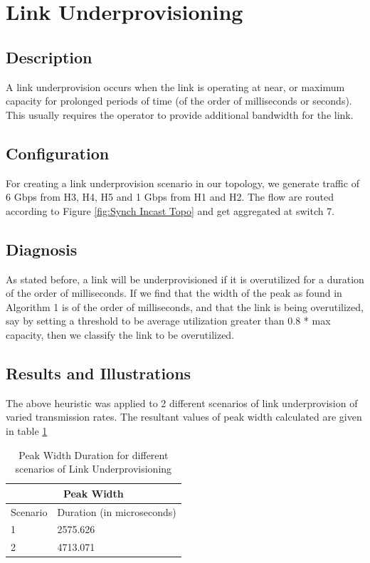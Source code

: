 \section{Link Underprovisioning}
\subsection{Description}
A link underprovision occurs when the link is operating at near, or maximum capacity for prolonged periods of time (of the order of milliseconds or seconds).
This usually requires the operator to provide additional bandwidth for the link.
\subsection{Configuration}
For creating a link underprovision scenario in our topology, we generate traffic of 6 Gbps from H3, H4, H5 and 1 Gbps from H1 and H2. The flow are routed
according to Figure \ref{fig:Synch Incast Topo} and get aggregated at switch 7.
\subsection{Diagnosis}
As stated before, a link will be underprovisioned if it is overutilized for a duration of the order of milliseconds.
If we find that the width of the peak as found in Algorithm 1 is of the order of milliseconds, and that the link is being overutilized, say by setting a threshold
to be average utilization greater than 0.8 * max capacity, then we classify the link to be overutilized.
\subsection{Results and Illustrations}
The above heuristic was applied to 2 different scenarios of link underprovision of varied transmission rates.
The resultant values of peak width calculated are given in table \ref{tab:Peak_Width}
\begin{table}[h]
\begin{center}
\begin{tabular}{ |p{3cm}|p{5cm}|  }
	\hline
	\multicolumn{2}{|c|}{Peak Width} \\
	\hline
	Scenario & Duration (in microseconds) \\
	\hline
	1 & 2575.626 \\
	2 & 4713.071 \\
	\hline
   \end{tabular}
\end{center}

\caption{Peak Width Duration for different scenarios of Link Underprovisioning}
\label{tab:Peak_Width}
\end{table}

